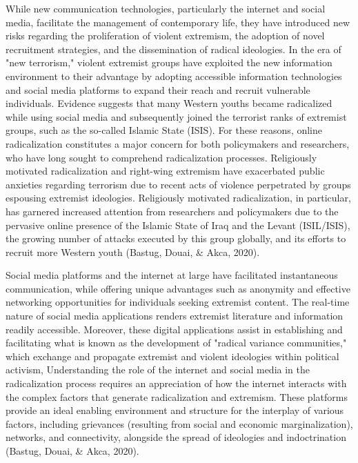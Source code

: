 \documentclass[10pt]{NSP1}
\begin{document}
While new communication technologies, particularly the internet and social media, facilitate the management of contemporary life, they have introduced new risks regarding the proliferation of violent extremism, the adoption of novel recruitment strategies, and the dissemination of radical ideologies. In the era of "new terrorism," violent extremist groups have exploited the new information environment to their advantage by adopting accessible information technologies and social media platforms to expand their reach and recruit vulnerable individuals. Evidence suggests that many Western youths became radicalized while using social media and subsequently joined the terrorist ranks of extremist groups, such as the so-called Islamic State (ISIS). For these reasons, online radicalization constitutes a major concern for both policymakers and researchers, who have long sought to comprehend radicalization processes. Religiously motivated radicalization and right-wing extremism have exacerbated public anxieties regarding terrorism due to recent acts of violence perpetrated by groups espousing extremist ideologies. Religiously motivated radicalization, in particular, has garnered increased attention from researchers and policymakers due to the pervasive online presence of the Islamic State of Iraq and the Levant (ISIL/ISIS), the growing number of attacks executed by this group globally, and its efforts to recruit more Western youth (Bastug, Douai, \& Akca, 2020).

Social media platforms and the internet at large have facilitated instantaneous communication, while offering unique advantages such as anonymity and effective networking opportunities for individuals seeking extremist content. The real-time nature of social media applications renders extremist literature and information readily accessible. Moreover, these digital applications assist in establishing and facilitating what is known as the development of "radical variance communities," which exchange and propagate extremist and violent ideologies within political activism, Understanding the role of the internet and social media in the radicalization process requires an appreciation of how the internet interacts with the complex factors that generate radicalization and extremism. These platforms provide an ideal enabling environment and structure for the interplay of various factors, including grievances (resulting from social and economic marginalization), networks, and connectivity, alongside the spread of ideologies and indoctrination (Bastug, Douai, \& Akca, 2020).
\end{document}
